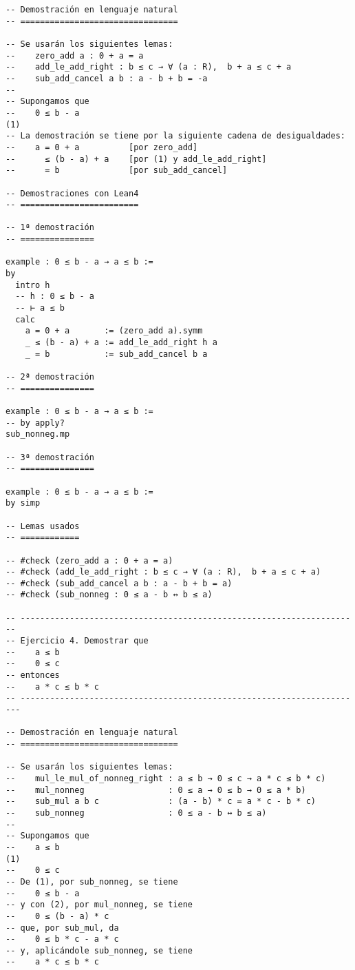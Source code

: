 \begin{verbatim}
-- Demostración en lenguaje natural
-- ================================

-- Se usarán los siguientes lemas:
--    zero_add a : 0 + a = a
--    add_le_add_right : b ≤ c → ∀ (a : R),  b + a ≤ c + a
--    sub_add_cancel a b : a - b + b = -a
--
-- Supongamos que
--    0 ≤ b - a                                                      (1)
-- La demostración se tiene por la siguiente cadena de desigualdades:
--    a = 0 + a          [por zero_add]
--      ≤ (b - a) + a    [por (1) y add_le_add_right]
--      = b              [por sub_add_cancel]

-- Demostraciones con Lean4
-- ========================

-- 1ª demostración
-- ===============

example : 0 ≤ b - a → a ≤ b :=
by
  intro h
  -- h : 0 ≤ b - a
  -- ⊢ a ≤ b
  calc
    a = 0 + a       := (zero_add a).symm
    _ ≤ (b - a) + a := add_le_add_right h a
    _ = b           := sub_add_cancel b a

-- 2ª demostración
-- ===============

example : 0 ≤ b - a → a ≤ b :=
-- by apply?
sub_nonneg.mp

-- 3ª demostración
-- ===============

example : 0 ≤ b - a → a ≤ b :=
by simp

-- Lemas usados
-- ============

-- #check (zero_add a : 0 + a = a)
-- #check (add_le_add_right : b ≤ c → ∀ (a : R),  b + a ≤ c + a)
-- #check (sub_add_cancel a b : a - b + b = a)
-- #check (sub_nonneg : 0 ≤ a - b ↔ b ≤ a)

-- ---------------------------------------------------------------------
-- Ejercicio 4. Demostrar que
--    a ≤ b
--    0 ≤ c
-- entonces
--    a * c ≤ b * c
-- ----------------------------------------------------------------------

-- Demostración en lenguaje natural
-- ================================

-- Se usarán los siguientes lemas:
--    mul_le_mul_of_nonneg_right : a ≤ b → 0 ≤ c → a * c ≤ b * c)
--    mul_nonneg                 : 0 ≤ a → 0 ≤ b → 0 ≤ a * b)
--    sub_mul a b c              : (a - b) * c = a * c - b * c)
--    sub_nonneg                 : 0 ≤ a - b ↔ b ≤ a)
--
-- Supongamos que
--    a ≤ b                                                          (1)
--    0 ≤ c
-- De (1), por sub_nonneg, se tiene
--    0 ≤ b - a
-- y con (2), por mul_nonneg, se tiene
--    0 ≤ (b - a) * c
-- que, por sub_mul, da
--    0 ≤ b * c - a * c
-- y, aplicándole sub_nonneg, se tiene
--    a * c ≤ b * c


\end{verbatim}
